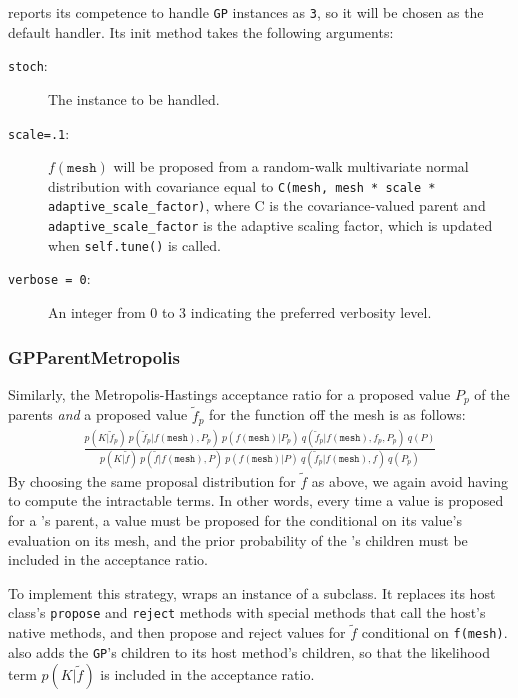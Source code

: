\documentclass[]{manual}
\begin{document}
 reports its competence to handle \texttt{GP} instances as \texttt{3}, so it will be chosen as the default handler. Its init method takes the following arguments:
\begin{description}
    \item[\texttt{stoch}:] The  instance to be handled.
    \item[\texttt{scale=.1}:] $f(\texttt{mesh})$ will be proposed from a random-walk multivariate normal distribution with covariance equal to \texttt{C(mesh, mesh * scale * adaptive_scale_factor)}, where C is the covariance-valued parent and \texttt{adaptive_scale_factor} is the adaptive scaling factor, which is updated when \texttt{self.tune()} is called.
    \item[\texttt{verbose = 0}:] An integer from 0 to 3 indicating the preferred verbosity level.
\end{description}

\subsubsection{GPParentMetropolis} 
Similarly, the Metropolis-Hastings acceptance ratio for a proposed value $P_p$ of the parents \emph{and} a proposed value $\tilde f_p$ for the function off the mesh is as follows:
\begin{eqnarray*}
    \frac{p(K|\tilde f_p)\ p(\tilde f_p|f(\texttt{mesh}), P_p)\ p(f(\texttt{mesh}) | P_p)\ q(\tilde f_p|f(\texttt{mesh}),f_p, P_p)\ q(P)}{p(K|\tilde f)\ p(\tilde f|f(\texttt{mesh}), P)\ p(f(\texttt{mesh}) | P)\ q(\tilde f_p|f(\texttt{mesh}),f)\ q(P_p)}
\end{eqnarray*}
By choosing the same proposal distribution for $\tilde f$ as above, we again avoid having to compute the intractable terms. In other words, every time a value is proposed for a 's parent, a value must be proposed for the   conditional on its value's evaluation on its mesh, and the prior probability of the 's children must be included in the acceptance ratio. 

To implement this strategy,  wraps an instance of a  subclass. It replaces its host class's \texttt{propose} and \texttt{reject} methods with special methods that call the host's native methods, and then propose and reject values for $\tilde f$ conditional on \texttt{f(mesh)}.  also adds the \texttt{GP}'s children to its host method's children, so that the likelihood term $p(K|\tilde f)$ is included in the acceptance ratio.
\end{document}
